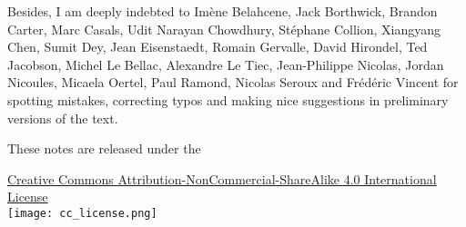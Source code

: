 Besides, I am deeply indebted to
Imène Belahcene, Jack Borthwick, Brandon Carter, Marc Casals,
Udit Narayan Chowdhury, Stéphane Collion, Xiangyang Chen,
Sumit Dey, Jean Eisenstaedt, Romain Gervalle, David Hirondel,
Ted Jacobson, Michel Le Bellac, Alexandre Le Tiec,
Jean-Philippe Nicolas, Jordan Nicoules, Micaela Oertel,
Paul Ramond, Nicolas Seroux and Frédéric Vincent for spotting mistakes, correcting typos and making
nice suggestions in preliminary versions of the text.


\vspace{3ex}
These notes are released under the
\begin{center}
\href{https://creativecommons.org/licenses/by-nc-sa/4.0/}{{Creative Commons Attribution-NonCommercial-ShareAlike 4.0 International License}}\\[1ex]
\texttt{[image: cc\_license.png]}
\end{center}

